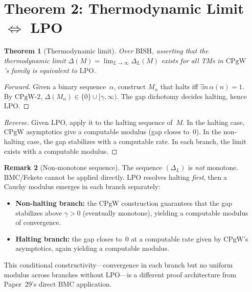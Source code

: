 \documentclass[11pt,a4paper]{article}
\theoremstyle{plain}
\newtheorem{theorem}{Theorem}[section]
\theoremstyle{definition}
\newtheorem{remark}[theorem]{Remark}
\newcommand{\LPO}{\ensuremath{\mathrm{LPO}}}
\newcommand{\BMC}{\ensuremath{\mathrm{BMC}}}
\newcommand{\BISH}{\ensuremath{\mathrm{BISH}}}
\newcommand{\CPgW}{\ensuremath{\mathrm{CPgW}}}
\begin{document}
\section{Theorem 2: Thermodynamic Limit $\Leftrightarrow$ LPO}%
\label{sec:thm2}

\begin{theorem}[Thermodynamic limit]\label{thm:thermo}
Over $\BISH$, asserting that the thermodynamic limit
$\Delta(M) = \lim_{L \to \infty} \Delta_L(M)$ exists for all
TMs in $\CPgW$'s family is equivalent to $\LPO$.
\end{theorem}

\begin{proof}[Forward]
Given a binary sequence~$\alpha$, construct $M_\alpha$ that halts
iff $\exists n\, \alpha(n) = 1$. By $\CPgW\text{-}2$,
$\Delta(M_\alpha) \in \{0\} \cup [\gamma, \infty)$. The gap
dichotomy decides halting, hence $\LPO$.
\end{proof}

\begin{proof}[Reverse]
Given $\LPO$, apply it to the halting sequence of~$M$.
In the halting case, $\CPgW$ asymptotics give a computable
modulus (gap closes to~0). In the non-halting case, the gap
stabilizes with a computable rate. In each branch, the limit
exists with a computable modulus.
\end{proof}

\begin{remark}[Non-monotone sequence]
The sequence $(\Delta_L)$ is \emph{not} monotone. $\BMC$/Fekete
cannot be applied directly. $\LPO$ resolves halting \emph{first},
then a Cauchy modulus emerges in each branch separately:
\begin{itemize}[nosep]
  \item \textbf{Non-halting branch:} the $\CPgW$ construction
    guarantees that the gap stabilizes above $\gamma > 0$
    (eventually monotone), yielding a computable modulus of
    convergence.
  \item \textbf{Halting branch:} the gap closes to~$0$ at a
    computable rate given by $\CPgW$'s asymptotics, again yielding
    a computable modulus.
\end{itemize}
This conditional constructivity---convergence in each branch but
no uniform modulus across branches without $\LPO$---is a different
proof architecture from Paper~29's direct $\BMC$ application.
\end{remark}
\end{document}
